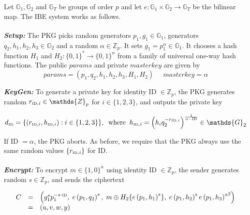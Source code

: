 \documentclass[11pt]{article}
\begin{document}
Let $\mathds{G}_1 , \mathds{G}_2$ and $\mathds{G}_T$ be groups of order $p$ and let $e : \mathds{G}_1 \times \mathds{G}_2 \rightarrow \mathds{G}_T$ be the bilinear map. The IBE system works as follows.\\
\\
\textbf{\textit{Setup:}} The PKG picks random generators $p_1, g_1 \in \mathds{G}_1$, generators $q_2, h_1, h_2, h_3 \in \mathds{G}_2$ and a random $\alpha \in \mathds{Z}_p$. It sets $g_1 = p_1^{\alpha} \in \mathds{G}_1$. It chooses a hash function $H_1$ and $H_2: \{ 0,1 \}^* \rightarrow \{ 0 , 1 \}^n$ from a family of universal one-way hash functions. The public $params$ and private $masterkey$ are given by
\begin{equation*}
 params = \left( p_1,q_2,h_1,h_2,h_3,H_1,H_2\right) \; \; \; \; \; masterkey = \alpha
\end{equation*}

\textbf{\textit{KeyGen:}} To generate a private key for identity ID $\in \mathds{Z}_p$, the PKG generates random $r_{\textrm{\tiny{ID}},i} \in \mathds{Z}_p$ for $i \in \{1,2,3\}$, and outputs the private key

\begin{equation*}
 d_{\textrm{\tiny{ID}}} = \{ \left( r_{\textrm{\tiny{ID}},i}, h_{\textrm{\tiny{ID}},i} \right) : i \in \{ 1, 2, 3\}\}, \; \; \textrm{where} \; \; h_{\textrm{\tiny{ID}},i} = \left( h_{i}q_2^{-r_{\textrm{\tiny{ID}},i}} \right)^{\frac{1}{\alpha-\textrm{\tiny{ID}}}} \in \mathds{G}_2
\end{equation*}

If ID $ = \alpha $, the PKG aborts. As before, we require that the PKG always use the same random values $\{r_{\textrm{\tiny{ID}},i}\}$ for ID.\\
\\
\textbf{\textit{Encrypt:}} To encrypt $m \in \{ 1, 0 \}^n$ using identity ID $\in \mathds{Z}_p$, the sender generates random $s \in \mathds{Z}_p$, and sends the ciphertext

\begin{equation*}
 \begin{array}{lcl}
  C & = & \left( g_{1}^{s}p_1^{-s\cdot\textrm{\tiny{ID}}}, \; e \left( p_1, q_2\right)^s, \; m \oplus H_2 \{ e \left( p_1, h_1 \right)^s \}, \; e \left( p_1, h_2 \right)^s e \left( p_1, h_3\right)^{s \beta} \right) \\ & = & \left( u, v, w, y \right)
 \end{array}
\end{equation*}
\end{document}
